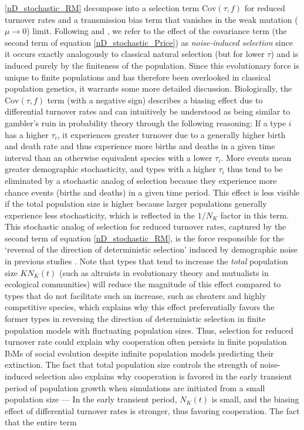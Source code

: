\eqref{nD_stochastic_RM} decompose into a selection term $\textrm{Cov}(\tau,f)$ for reduced turnover rates and a transmission bias term that vanishes in the weak mutation ($\mu \to 0$) limit. Following \cite{constable_demographic_2016} and  \cite{week_white_2021}, we refer to the effect of the covariance term (the second term of equation \eqref{nD_stochastic_Price}) as \emph{noise-induced selection} since it occurs exactly analogously to classical natural selection (but for lower $\tau$) and is induced purely by the finiteness of the population. Since this evolutionary force is unique to finite populations and has therefore been overlooked in classical population genetics, it warrants some more detailed discussion. Biologically, the $\textrm{Cov}(\tau,f)$ term (with a negative sign) describes a biasing effect due to differential turnover rates and can intuitively be understood as being similar to gambler's ruin in probability theory through the following reasoning: If a type $i$ has a higher $\tau_i$, it experiences greater turnover due to a generally higher birth and death rate and thus experience more births and deaths in a given time interval than an otherwise equivalent species with a lower $\tau_i$. More events mean greater demographic stochasticity, and types with a higher $\tau_i$ thus tend to be eliminated by a stochastic analog of selection because they experience more chance events (births and deaths) in a given time period. This effect is less visible if the total population size is higher because larger populations generally experience less stochasticity, which is reflected in the $1/N_K$ factor in this term. This stochastic analog of selection for reduced turnover rates, captured by the second term of equation \eqref{nD_stochastic_RM}, is the force responsible for the `reversal of the direction of deterministic selection' induced by demographic noise in previous studies \citep{houchmandzadeh_selection_2012, houchmandzadeh_fluctuation_2015, constable_demographic_2016, mcleod_social_2019}. Note that types that tend to increase the \emph{total} population size $KN_K(t)$ (such as altruists in evolutionary theory and mutualists in ecological communities) will reduce the magnitude of this effect compared to types that do not facilitate such an increase, such as cheaters and highly competitive species, which explains why this effect preferentially favors the former types in reversing the direction of deterministic selection in finite population models with fluctuating population sizes. Thus, selection for reduced turnover rate could explain why cooperation often persists in finite population IbMs of social evolution \citep{houchmandzadeh_selection_2012,houchmandzadeh_fluctuation_2015,chotibut_evolutionary_2015,behar_fluctuations-induced_2016,mcleod_social_2019} despite infinite population models predicting their extinction. The fact that total population size controls the strength of noise-induced selection also explains why cooperation is favored in the early transient period of population growth \citep{melbinger_evolutionary_2010} when simulations are initiated from a small population size --- In the early transient period, $N_K(t)$ is small, and the biasing effect of differential turnover rates is stronger, thus favoring cooperation. The fact that the entire term 